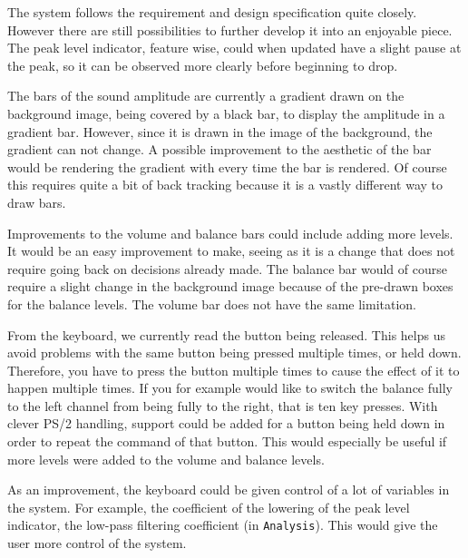 The system follows the requirement and design specification quite closely. However there are still possibilities to further develop it into an enjoyable piece. %
The peak level indicator, feature wise, could when updated have a slight pause at the peak, so it can be observed more clearly before beginning to drop.

The bars of the sound amplitude are currently a gradient drawn on the background image, being covered by a black bar, to display the amplitude in a gradient bar. However, since it is drawn in the image of the background, the gradient can not change. A possible improvement to the aesthetic of the bar would be rendering the gradient with every time the bar is rendered. Of course this requires quite a bit of back tracking because it is a vastly different way to draw bars. 

Improvements to the volume and balance bars could include adding more levels. It would be an easy improvement to make, seeing as it is a change that does not require going back on decisions already made. The balance bar would of course require a slight change in the background image because of the pre-drawn boxes for the balance levels. The volume bar does not have the same limitation.

From the keyboard, we currently read the button being released. This helps us avoid problems with the same button being pressed multiple times, or held down. Therefore, you have to press the button multiple times to cause the effect of it to happen multiple times. If you for example would like to switch the balance fully to the left channel from being fully to the right, that is ten key presses. With clever PS/2 handling, support could be added for a button being held down in order to  repeat the command of that button. This would especially be useful if more levels were added to the volume and balance levels. 

As an improvement, the keyboard could be given control of a lot of variables in the system. For example, the coefficient of the lowering of the peak level indicator, the low-pass filtering coefficient (in \texttt{Analysis}). This would give the user more control of the system.
